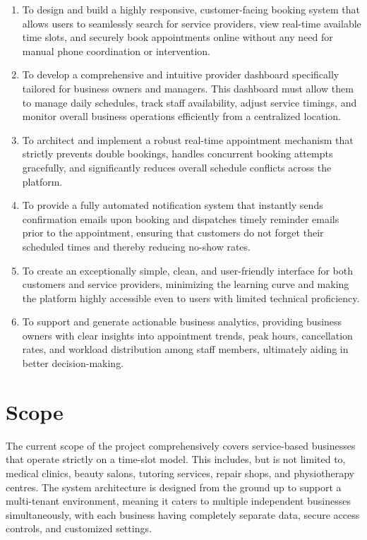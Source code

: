 \begin{enumerate}
\item To design and build a highly responsive, customer-facing booking system that allows users to seamlessly search for service providers, view real-time available time slots, and securely book appointments online without any need for manual phone coordination or intervention.
\item To develop a comprehensive and intuitive provider dashboard specifically tailored for business owners and managers. This dashboard must allow them to manage daily schedules, track staff availability, adjust service timings, and monitor overall business operations efficiently from a centralized location.
\item To architect and implement a robust real-time appointment mechanism that strictly prevents double bookings, handles concurrent booking attempts gracefully, and significantly reduces overall schedule conflicts across the platform.
\item To provide a fully automated notification system that instantly sends confirmation emails upon booking and dispatches timely reminder emails prior to the appointment, ensuring that customers do not forget their scheduled times and thereby reducing no-show rates.
\item To create an exceptionally simple, clean, and user-friendly interface for both customers and service providers, minimizing the learning curve and making the platform highly accessible even to users with limited technical proficiency.
\item To support and generate actionable business analytics, providing business owners with clear insights into appointment trends, peak hours, cancellation rates, and workload distribution among staff members, ultimately aiding in better decision-making.
\end{enumerate}

\section{Scope}
The current scope of the project comprehensively covers service-based businesses that operate strictly on a time-slot model. This includes, but is not limited to, medical clinics, beauty salons, tutoring services, repair shops, and physiotherapy centres. The system architecture is designed from the ground up to support a multi-tenant environment, meaning it caters to multiple independent businesses simultaneously, with each business having completely separate data, secure access controls, and customized settings. 

